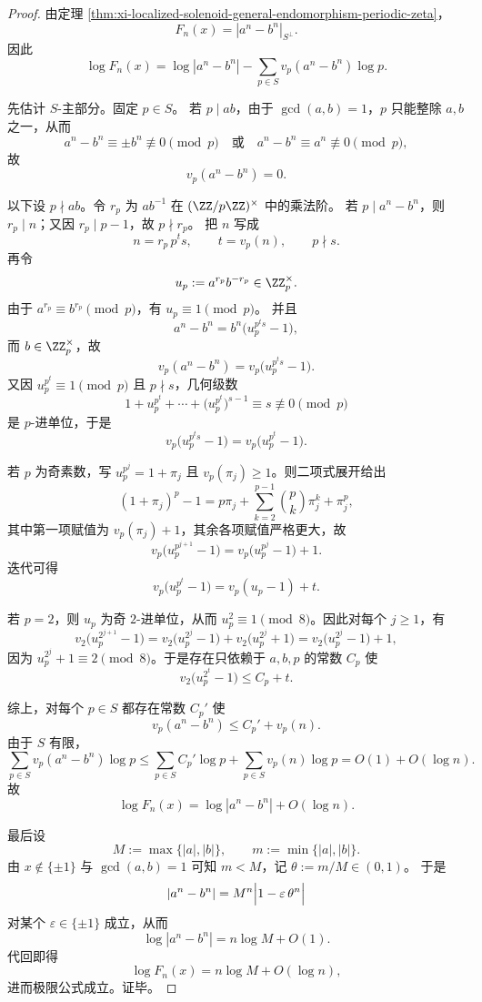 \begin{proof}
由定理 \ref{thm:xi-localized-solenoid-general-endomorphism-periodic-zeta}，
\[
F_n(x)=|a^n-b^n|_{S^\perp}.
\]
因此
\[
\log F_n(x)
=
\log|a^n-b^n|-\sum_{p\in S}v_p(a^n-b^n)\log p.
\]

先估计 \(S\)-主部分。固定 \(p\in S\)。
若 \(p\mid ab\)，由于 \(\gcd(a,b)=1\)，\(p\) 只能整除 \(a,b\) 之一，从而
\[
a^n-b^n\equiv \pm b^n \not\equiv 0 \pmod p
\quad\text{或}\quad
a^n-b^n\equiv a^n \not\equiv 0 \pmod p,
\]
故
\[
v_p(a^n-b^n)=0.
\]

以下设 \(p\nmid ab\)。令 \(r_p\) 为 \(ab^{-1}\) 在 \((\ZZ/p\ZZ)^\times\) 中的乘法阶。
若 \(p\mid a^n-b^n\)，则 \(r_p\mid n\)；又因 \(r_p\mid p-1\)，故 \(p\nmid r_p\)。
把 \(n\) 写成
\[
n=r_p\,p^t s,
\qquad
t=v_p(n),
\qquad
p\nmid s.
\]
再令
\[
u_p:=a^{r_p}b^{-r_p}\in \ZZ_p^\times.
\]
由于 \(a^{r_p}\equiv b^{r_p}\pmod p\)，有 \(u_p\equiv 1\pmod p\)。
并且
\[
a^n-b^n
=
b^n\bigl(u_p^{p^t s}-1\bigr),
\]
而 \(b\in \ZZ_p^\times\)，故
\[
v_p(a^n-b^n)=v_p\bigl(u_p^{p^t s}-1\bigr).
\]
又因 \(u_p^{p^t}\equiv 1\pmod p\) 且 \(p\nmid s\)，几何级数
\[
1+u_p^{p^t}+\cdots+\bigl(u_p^{p^t}\bigr)^{s-1}
\equiv s \not\equiv 0 \pmod p
\]
是 \(p\)-进单位，于是
\[
v_p\bigl(u_p^{p^t s}-1\bigr)=v_p\bigl(u_p^{p^t}-1\bigr).
\]

若 \(p\) 为奇素数，写 \(u_p^{p^j}=1+\pi_j\) 且 \(v_p(\pi_j)\ge 1\)。则二项式展开给出
\[
(1+\pi_j)^p-1
=
p\pi_j+\sum_{k=2}^{p-1}\binom{p}{k}\pi_j^k+\pi_j^p,
\]
其中第一项赋值为 \(v_p(\pi_j)+1\)，其余各项赋值严格更大，故
\[
v_p\bigl(u_p^{p^{j+1}}-1\bigr)
=
v_p\bigl(u_p^{p^j}-1\bigr)+1.
\]
迭代可得
\[
v_p\bigl(u_p^{p^t}-1\bigr)=v_p(u_p-1)+t.
\]

若 \(p=2\)，则 \(u_p\) 为奇 \(2\)-进单位，从而 \(u_p^2\equiv 1\pmod 8\)。因此对每个 \(j\ge 1\)，有
\[
v_2\bigl(u_p^{2^{j+1}}-1\bigr)
=
v_2\bigl(u_p^{2^j}-1\bigr)+v_2\bigl(u_p^{2^j}+1\bigr)
=
v_2\bigl(u_p^{2^j}-1\bigr)+1,
\]
因为 \(u_p^{2^j}+1\equiv 2\pmod 8\)。于是存在只依赖于 \(a,b,p\) 的常数 \(C_p\) 使
\[
v_2\bigl(u_p^{2^t}-1\bigr)\le C_p+t.
\]

综上，对每个 \(p\in S\) 都存在常数 \(C_p'\) 使
\[
v_p(a^n-b^n)\le C_p'+v_p(n).
\]
由于 \(S\) 有限，
\[
\sum_{p\in S}v_p(a^n-b^n)\log p
\le
\sum_{p\in S}C_p'\log p+\sum_{p\in S}v_p(n)\log p
=
O(1)+O(\log n).
\]
故
\[
\log F_n(x)=\log|a^n-b^n|+O(\log n).
\]

最后设
\[
M:=\max\{|a|,|b|\},
\qquad
m:=\min\{|a|,|b|\}.
\]
由 \(x\notin\{\pm1\}\) 与 \(\gcd(a,b)=1\) 可知 \(m<M\)，记 \(\theta:=m/M\in(0,1)\)。
于是
\[
|a^n-b^n|
=
M^n\Bigl|1-\varepsilon\,\theta^n\Bigr|
\]
对某个 \(\varepsilon\in\{\pm1\}\) 成立，从而
\[
\log|a^n-b^n|
=
n\log M+O(1).
\]
代回即得
\[
\log F_n(x)=n\log M+O(\log n),
\]
进而极限公式成立。证毕。
\end{proof}


